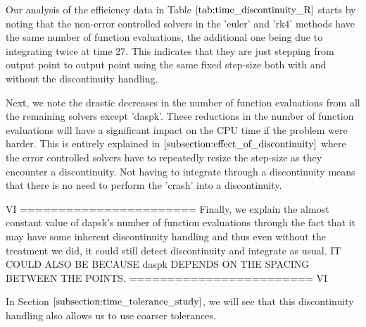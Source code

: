 Our analysis of the efficiency data in Table $\ref{tab:time_discontinuity_R}$ starts by noting that the non-error controlled solvers in the 'euler' and 'rk4' methods have the same number of function evaluations, the additional one being due to integrating twice at time 27. This indicates that they are just stepping from output point to output point using the same fixed step-size both with and without the discontinuity handling.

Next, we note the drastic decreases in the number of function evaluations from all the remaining solvers except 'daspk'. These reductions in the number of function evaluations will have a significant impact on the CPU time if the problem were harder. This is entirely explained in $\ref{subsection:effect_of_discontinuity}$ where the error controlled solvers have to repeatedly resize the step-size as they encounter a discontinuity. Not having to integrate through a discontinuity means that there is no need to perform the 'crash' into a discontinuity.

VI =======================
Finally, we explain the almost constant value of dapsk's number of function evaluations through the fact that it may have some inherent discontinuity handling and thus even without the treatment we did, it could still detect discontinuity and integrate as usual. IT COULD ALSO BE BECAUSE daspk DEPENDS ON THE SPACING BETWEEN THE POINTS.
======================== VI

In Section $\ref{subsection:time_tolerance_study}$, we will see that this discontinuity handling also allows us to use coarser tolerances.

